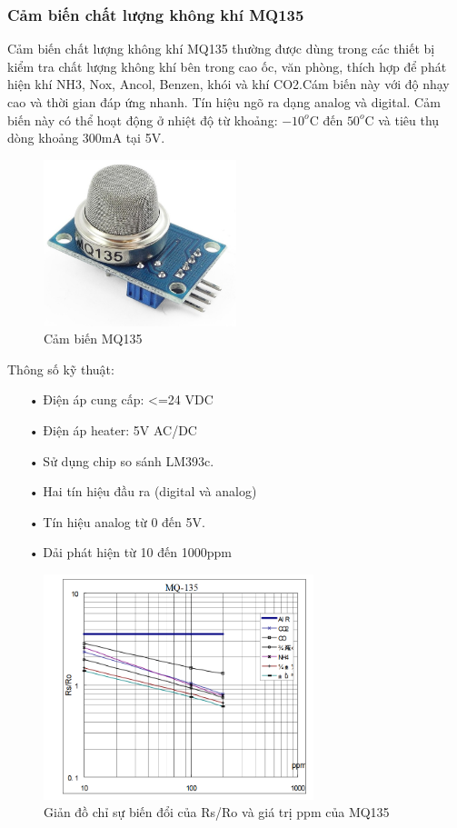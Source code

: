 \subsubsection*{Cảm biến chất lượng không khí MQ135} 
Cảm biến chất lượng không khí MQ135 thường được dùng trong các thiết bị kiểm tra chất lượng không khí bên trong cao ốc, văn phòng, thích hợp để phát hiện khí NH3, Nox, Ancol, Benzen, khói và khí CO2.Cám biến này với độ nhạy cao và thời gian đáp ứng nhanh. Tín hiệu ngõ ra dạng analog và digital. Cảm biến này có thể hoạt động ở nhiệt độ từ khoảng: $-10^{o}$C đến $50^{o}$C và tiêu thụ dòng khoảng 300mA tại 5V.
\begin{figure}[H]
	\centering    
	\includegraphics[width=0.5\textwidth]{mq135}
	\caption[Cảm biến MQ135]{Cảm biến MQ135}
	\label{fig:mq135}
\end{figure}
Thông số kỹ thuật:
\begin{itemize}
\item[•]Điện áp cung cấp: <=24 VDC
\item[•]Điện áp heater: 5V AC/DC
\item[•]Sử dụng chip so sánh LM393c.
\item[•]Hai tín hiệu đầu ra (digital và analog)
\item[•]Tín hiệu analog từ 0 đến 5V.
\item[•]Dải phát hiện từ 10 đến 1000ppm
\end{itemize}

\begin{figure}[H]
	\centering    
	\includegraphics[width=0.7\textwidth]{mq135_mqh1}
	\caption[Giản đồ chỉ sự biến đổi của Rs/Ro và giá trị ppm của MQ135]{Giản đồ chỉ sự biến đổi của Rs/Ro và giá trị ppm của MQ135}
	\label{fig:mq135_mqh1}
\end{figure}

